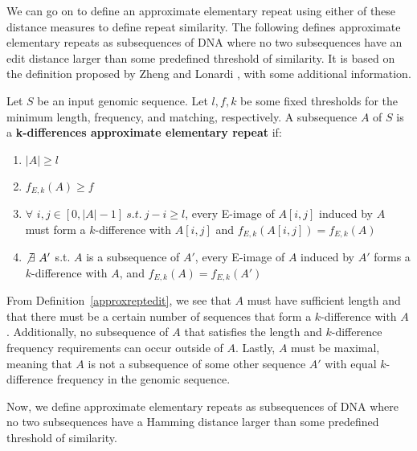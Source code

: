 \begin{notate}
\begin{itemize}
\end{itemize}
\end{notate}

We can go on to define an approximate elementary repeat using either of these distance measures to define repeat similarity. The following defines approximate elementary repeats as subsequences of DNA where no two subsequences have an edit distance larger than some predefined threshold of similarity. It is based on the definition proposed by Zheng and Lonardi \cite{zheng2005discovery}, with some additional information.

\begin{defn}
Let $S$ be an input genomic sequence. Let $l, f, k$ be some fixed thresholds for the minimum length, frequency, and matching, respectively. A subsequence $A$ of $S$ is a \textbf{k-differences approximate elementary repeat} if:
\begin{enumerate}
\item{$|A| \geq l$} %
\item{$f_{E,k}(A) \geq f$}
\item{$\forall$ $i, j \in [0,|A|-1] \ s.t. \ j-i \geq l$, every E-image of $A[i,j]$ induced by $A$ must form a $k$-difference with $A[i,j]$ and $f_{E,k}(A[i,j]) = f_{E,k}(A)$}
\item{$\not\exists \ A'$  s.t. $A$ is a subsequence of $A'$, every E-image of $A$ induced by $A'$ forms a $k$-difference with $A$, and $f_{E,k}(A) = f_{E,k}(A')$}
\end{enumerate}
\label{approxreptedit}
\end{defn}

From Definition~\ref{approxreptedit}, we see that $A$ must have sufficient length and that there must be a certain number of sequences that form a $k$-difference with $A$. Additionally, no subsequence of $A$ that satisfies the length and $k$-difference frequency requirements can occur outside of $A$. Lastly, $A$ must be maximal, meaning that $A$ is not a subsequence of some other sequence $A'$ with equal $k$-difference frequency in the genomic sequence.


Now, we define approximate elementary repeats as subsequences of DNA where no two subsequences have a Hamming distance larger than some predefined threshold of similarity. 

